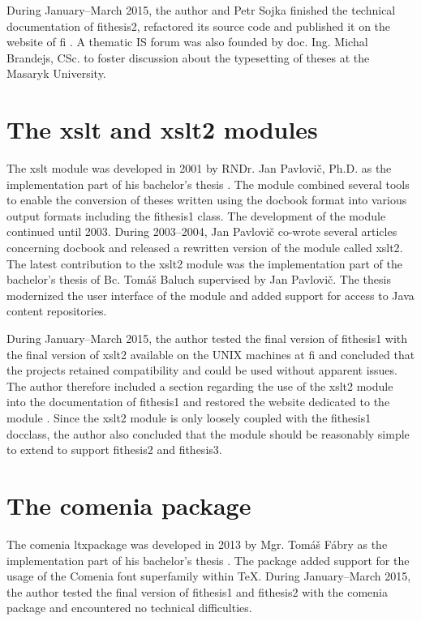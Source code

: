 \documentclass[12pt,twoside,cover,color,table]%
  {fithesis3/fithesis3/fithesis3} %
\begin{document}
  During January--March 2015, the author and Petr Sojka finished
  the technical documentation of \textsf{fithesis2}, refactored its
  source code and published it on the website of \gls{fi}
  \cite{fithesisWeb}. A thematic IS forum \cite{fithesisForum} was
  also founded by doc. Ing. Michal Brandejs, CSc. to foster
  discussion about the typesetting of theses at the Masaryk
  University.

  \section{The \textsf{xslt} and \textsf{xslt2} modules}
  \label{sec:xslt}
  The \textsf{xslt} module was developed in 2001 by RNDr. Jan
  Pavlovič, Ph.D. as the implementation part of his bachelor's
  thesis \cite{PavlovicO1}. The module combined several tools to
  enable the conversion of theses written using the \gls{docbook}
  format into various output formats including the
  \textsf{fithesis1} class.  The development of the module
  continued until 2003. During 2003--2004, Jan Pavlovič co-wrote
  several articles concerning \gls{docbook} \cite{Pavlovic03,
  PitPav03, PitPav04} and released a rewritten version of the
  module called \textsf{xslt2}. The latest contribution to the
  \textsf{xslt2} module was the implementation part of the
  bachelor's thesis of Bc. Tomáš Baluch \cite{Baluch09} supervised
  by Jan Pavlovič. The thesis modernized the user interface of the
  module and added support for access to Java content repositories.

  During January--March 2015, the author tested the final version
  of \textsf{fithesis1} with the final version of \textsf{xslt2}
  available on the UNIX machines at \gls{fi} and concluded that the
  projects retained compatibility and could be used without
  apparent issues. The author therefore included a section
  regarding the use of the \textsf{xslt2} module into the
  documentation of \textsf{fithesis1} and restored the website
  dedicated to the module \cite{xslt2web}. Since the \textsf{xslt2}
  module is only loosely coupled with the \textsf{fithesis1}
  \gls{docclass}, the author also concluded that the module should
  be reasonably simple to extend to support \textsf{fithesis2} and
  \textsf{fithesis3}.

  \section{The \textsf{comenia} package}\label{sec:comenia}
  The \textsf{comenia} \gls{ltxpackage} was developed in 2013 by
  Mgr.  Tomáš Fábry as the implementation part of his bachelor's
  thesis \cite{Fabry13}. The package added support for the usage of
  the Comenia font superfamily within \TeX{}. During January--March
  2015, the author tested the final version of \textsf{fithesis1}
  and \textsf{fithesis2} with the \textsf{comenia} package and
  encountered no technical difficulties.
\end{document}
